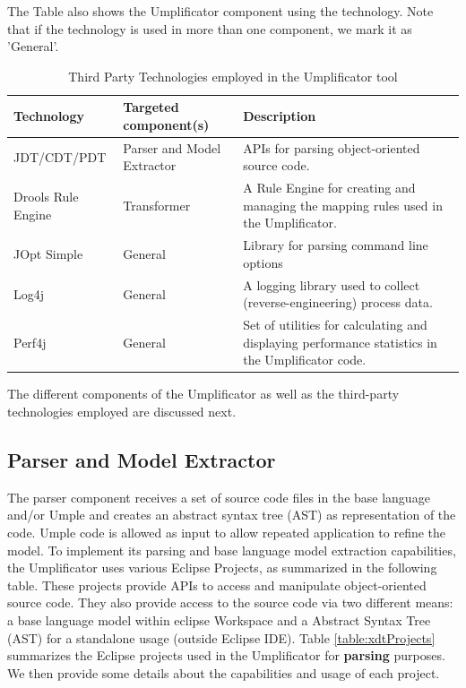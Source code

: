  
The Table also shows the Umplificator component using the technology. Note that if the technology is used in more than one component, we mark it as 'General'.

\begin{table}[h]
\caption{Third Party Technologies employed in the Umplificator tool}
\label{table:technologies}
\begin{tabularx}{\textwidth}{l|YY}
\toprule
{}
\textbf{Technology} & \textbf{Targeted component(s)}  & \textbf{Description}  \\ \hline
JDT/CDT/PDT  & Parser and Model Extractor & APIs for parsing object-oriented source code.\\ \hline 
Drools Rule Engine & Transformer  & A Rule Engine for creating and managing the mapping rules used in the Umplificator.	 \\ \hline	
JOpt Simple & General  & Library for parsing command line options \\ \hline	
Log4j & General & A logging library used to collect (reverse-engineering) process data.	\\ \hline	
Perf4j & General & Set of utilities for calculating and displaying performance statistics in the Umplificator code. \\ \hline	
\end{tabularx}
\end{table}

The different components of the Umplificator as well as the third-party technologies employed are discussed next. 

\subsection{Parser and Model Extractor}

The parser component receives a set of source code files in the base language and/or Umple and creates an abstract syntax tree (AST) as representation of the code. Umple code is allowed as input to allow repeated application to refine the model. To implement its parsing and base language model extraction capabilities, the Umplificator uses various Eclipse Projects, as summarized in the following table. These projects provide APIs to access and manipulate object-oriented source code.
They also provide access to the  source code via two different means: a base language model within eclipse Workspace and a Abstract Syntax Tree (AST) for a standalone usage (outside Eclipse IDE). Table \ref{table:xdtProjects} summarizes the Eclipse projects used in the Umplificator for \textbf{parsing} purposes. We then provide some details about the capabilities and usage of each project. 

